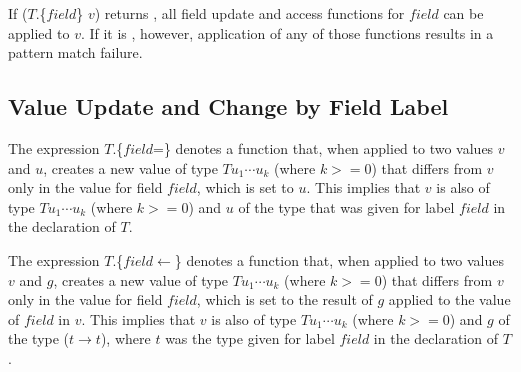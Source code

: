 
If ($T$.\{$field$\} $v$) returns , all field update and access functions for $field$ can be applied to $v$. If it is , however, application of any of those functions results in a pattern match failure.


\subsection{Value Update and Change by Field Label} \label{fiieldupd}

The expression $T$.\{$field$=\} denotes a function that, when applied to two values $v$ and $u$, creates a new value of type $T u_1 \cdots u_k$  (where $k>=0$) that differs from $v$ only in the value for field $field$, which is set to $u$.
This implies that $v$ is also of type $T u_1 \cdots u_k$  (where $k>=0$) and $u$ of the type that was given for label $field$ in the declaration of $T$.

The expression $T$.\{$field$$\leftarrow$\} denotes a function that, when applied to two values $v$ and $g$, creates a new value of type $T u_1 \cdots u_k$  (where $k>=0$) that differs from $v$ only in the value for field $field$, which is set to the result of $g$ applied to the value of $field$ in $v$.
This implies that $v$ is also of type $T u_1 \cdots u_k$  (where $k>=0$) and $g$ of the type ($t \rightarrow t$), where $t$  was the type given for label $field$ in the declaration of $T$.

